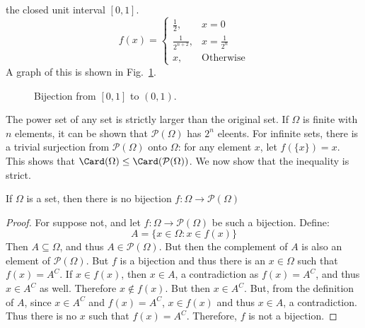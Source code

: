         the closed unit interval $[0,1]$.
        \begin{equation}
            f(x)=
            \begin{cases}
                \frac{1}{2},&x=0\\
                \frac{1}{2^{n+2}},&x=\frac{1}{2^{n}}\\
                x,&\textrm{Otherwise}
            \end{cases}
        \end{equation}
        A graph of this is shown in
        Fig.~\ref{fig:Measure_Theory_Bijection_Closed_I_to_Open}.
        \begin{figure}[H]
            \centering
            \captionsetup{type=figure}
            
            \caption{Bijection from $[0,1]$ to $(0,1)$.}
            \label{fig:Measure_Theory_Bijection_Closed_I_to_Open}
        \end{figure}
        The power set of any set is strictly larger than the
        original set. If $\Omega$ is finite with $n$ elements, it
        can be shown that $\mathcal{P}(\Omega)$ has $2^{n}$
        eleents. For infinite sets, there is a trivial surjection
        from $\mathcal{P}(\Omega)$ onto $\Omega$: for any element
        $x$, let $f(\{x\})=x$. This shows that
        $\Card(\Omega)\leq\Card(\mathcal{P}(\Omega))$. We now show
        that the inequality is strict.
        \begin{theorem}
            If $\Omega$ is a set, then there is no bijection
            $f:\Omega\rightarrow\mathcal{P}(\Omega)$
        \end{theorem}
        \begin{proof}
            For suppose not, and let
            $f:\Omega\rightarrow\mathcal{P}(\Omega)$ be such a
            bijection. Define:
            \begin{equation}
                A=\{x\in\Omega:x\in{f}(x)\}
            \end{equation}
            Then $A\subseteq\Omega$, and thus
            $A\in\mathcal{P}(\Omega)$. But then the complement of
            $A$ is also an element of $\mathcal{P}(\Omega)$. But
            $f$ is a bijection and thus there is an $x\in\Omega$
            such that $f(x)=A^{C}$. If $x\in{f}(x)$, then
            $x\in{A}$, a contradiction as $f(x)=A^{C}$, and thus
            $x\in{A}^{C}$ as well. Therefore $x\notin{f}(x)$. But
            then $x\in{A}^{C}$. But, from the definition of $A$,
            since $x\in{A}^{C}$ and $f(x)=A^{C}$, $x\in{f}(x)$
            and thus $x\in{A}$, a contradiction. Thus there is no
            $x$ such that $f(x)=A^{C}$. Therefore, $f$ is not a
            bijection.
        \end{proof}
